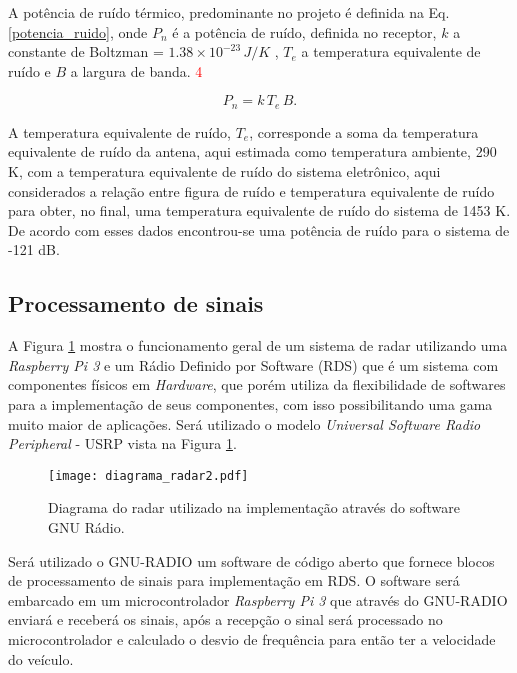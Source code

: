 A potência de ruído térmico, predominante no projeto é definida na Eq. \ref{potencia_ruido}, onde $P_n$ é a potência de ruído, definida no receptor, $k$ a constante de Boltzman = $1.38 \times 10^{-23} \, J/K$ , $T_e$ a temperatura equivalente de ruído e $B$ a largura de banda. \textcolor{red}{4}

\begin{equation}\label{potencia_ruido}
    P_n = k\, T_e\,B.
\end{equation}

A temperatura equivalente de ruído, $T_e$, corresponde a soma da temperatura equivalente de ruído da antena, aqui estimada como temperatura ambiente, 290 K, com a temperatura equivalente de ruído do sistema eletrônico, aqui considerados a relação entre figura de ruído e temperatura equivalente de ruído para obter, no final, uma temperatura equivalente de ruído do sistema de 1453 K. De acordo com esses dados encontrou-se uma potência de ruído para o sistema de -121 dB.
\subsection{Processamento de sinais}

A Figura \ref{processos_geral_radar} mostra o funcionamento geral de um sistema de radar utilizando uma \emph{Raspberry Pi 3} e um Rádio Definido por Software (RDS) que é um sistema com componentes físicos em  \emph{Hardware}, que porém utiliza da flexibilidade de softwares para a implementação  de seus componentes, com isso possibilitando uma gama muito maior de aplicações. Será utilizado o  modelo \emph{Universal Software Radio Peripheral} - USRP vista na Figura \ref{processos_geral_radar}.



\begin{figure}[H]
    \centering
    \texttt{[image: diagrama\_radar2.pdf]}
    \caption{Diagrama do radar utilizado na implementação através do software GNU Rádio.}
    \label{processos_geral_radar}
\end{figure}

Será utilizado o GNU-RADIO um software de código aberto que fornece blocos de processamento de sinais para implementação em RDS. O software será embarcado em um microcontrolador \emph{Raspberry Pi 3} que através do GNU-RADIO enviará e receberá os sinais, após a recepção o sinal será processado no microcontrolador e calculado o desvio de frequência para então ter a velocidade do veículo. 


